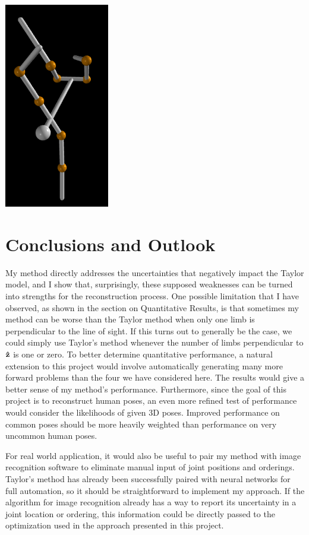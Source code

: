 \documentclass[final]{article}
\begin{document}
\begin{spacing}{1.1}
\begin{center}
  \includegraphics[height=9cm]{fig/mybreakdancerecons2.png}
\end{center}

\section{Conclusions and Outlook}

My method directly addresses the uncertainties that negatively impact the Taylor model, and I show that, surprisingly, these supposed weaknesses can be turned into strengths for the reconstruction process. One possible limitation that I have observed, as shown in the section on Quantitative Results, is that sometimes my method can be worse than the Taylor method when only one limb is perpendicular to the line of sight. If this turns out to generally be the case, we could simply use Taylor's method whenever the number of limbs perpendicular to $\vu{z}$ is one or zero. To better determine quantitative performance, a natural extension to this project would involve automatically generating many more forward problems than the four we have considered here. The results would give a better sense of my method's performance. Furthermore, since the goal of this project is to reconstruct human poses, an even more refined test of performance would consider the likelihoods of given 3D poses. Improved performance on common poses should be more heavily weighted than performance on very uncommon human poses.


For real world application, it would also be useful to pair my method with image recognition software to eliminate manual input of joint positions and orderings. Taylor's method has already been successfully paired with neural networks\cite{Fan} for full automation, so it should be straightforward to implement my approach. If the algorithm for image recognition already has a way to report its uncertainty in a joint location or ordering, this information could be directly passed to the optimization used in the approach presented in this project.


\end{spacing}
\end{document}
